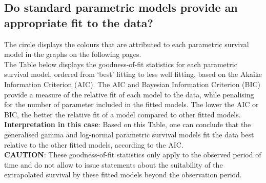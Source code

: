 \documentclass[]{article}
\begin{document}
\subsection{Do standard parametric models provide an appropriate fit to
the
data?}\label{do-standard-parametric-models-provide-an-appropriate-fit-to-the-data}

The circle displays the colours that are attributed to each parametric
survival model in the graphs on the following pages.\\
The Table below displays the goodness-of-fit statistics for each
parametric survival model, ordered from `best' fitting to less well
fitting, based on the Akaike Information Criterion (AIC). The AIC and
Bayesian Information Criterion (BIC) provide a measure of the relative
fit of each model to the data, while penalising for the number of
parameter included in the fitted models. The lower the AIC or BIC, the
better the relative fit of a model compared to other fitted models.\\
\textbf{Interpretation in this case}: Based on this Table, one can
conclude that the generalised gamma and log-normal parametric survival
models fit the data best relative to the other fitted models, according
to the AIC.\\
\textbf{CAUTION}: These goodness-of-fit statistics only apply to the
observed period of time and do not allow to issue statements about the
suitability of the extrapolated survival by these fitted models beyond
the observation period.
\end{document}

